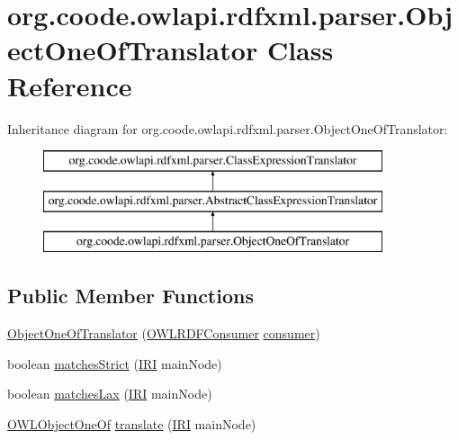 \hypertarget{classorg_1_1coode_1_1owlapi_1_1rdfxml_1_1parser_1_1_object_one_of_translator}{\section{org.\-coode.\-owlapi.\-rdfxml.\-parser.\-Object\-One\-Of\-Translator Class Reference}
\label{classorg_1_1coode_1_1owlapi_1_1rdfxml_1_1parser_1_1_object_one_of_translator}
}
Inheritance diagram for org.\-coode.\-owlapi.\-rdfxml.\-parser.\-Object\-One\-Of\-Translator\-:\begin{figure}[H]
\begin{center}
\leavevmode
\includegraphics[height=3.000000cm]{classorg_1_1coode_1_1owlapi_1_1rdfxml_1_1parser_1_1_object_one_of_translator}
\end{center}
\end{figure}
\subsection*{Public Member Functions}
\begin{DoxyCompactItemize}
\item 
\hyperlink{classorg_1_1coode_1_1owlapi_1_1rdfxml_1_1parser_1_1_object_one_of_translator_af56bac64f4b0c69de150ffd3539de5c1}{Object\-One\-Of\-Translator} (\hyperlink{classorg_1_1coode_1_1owlapi_1_1rdfxml_1_1parser_1_1_o_w_l_r_d_f_consumer}{O\-W\-L\-R\-D\-F\-Consumer} \hyperlink{classorg_1_1coode_1_1owlapi_1_1rdfxml_1_1parser_1_1_abstract_class_expression_translator_ae547084cdd5b92c03835b5aa404f823b}{consumer})
\item 
boolean \hyperlink{classorg_1_1coode_1_1owlapi_1_1rdfxml_1_1parser_1_1_object_one_of_translator_ae81bcde3386227582f25b6c45d77fc0c}{matches\-Strict} (\hyperlink{classorg_1_1semanticweb_1_1owlapi_1_1model_1_1_i_r_i}{I\-R\-I} main\-Node)
\item 
boolean \hyperlink{classorg_1_1coode_1_1owlapi_1_1rdfxml_1_1parser_1_1_object_one_of_translator_af3b0cc0ddfb5f42106ab7452358be78c}{matches\-Lax} (\hyperlink{classorg_1_1semanticweb_1_1owlapi_1_1model_1_1_i_r_i}{I\-R\-I} main\-Node)
\item 
\hyperlink{interfaceorg_1_1semanticweb_1_1owlapi_1_1model_1_1_o_w_l_object_one_of}{O\-W\-L\-Object\-One\-Of} \hyperlink{classorg_1_1coode_1_1owlapi_1_1rdfxml_1_1parser_1_1_object_one_of_translator_ad96fae2c554291bca09732bd8b466ef4}{translate} (\hyperlink{classorg_1_1semanticweb_1_1owlapi_1_1model_1_1_i_r_i}{I\-R\-I} main\-Node)
\end{DoxyCompactItemize}
